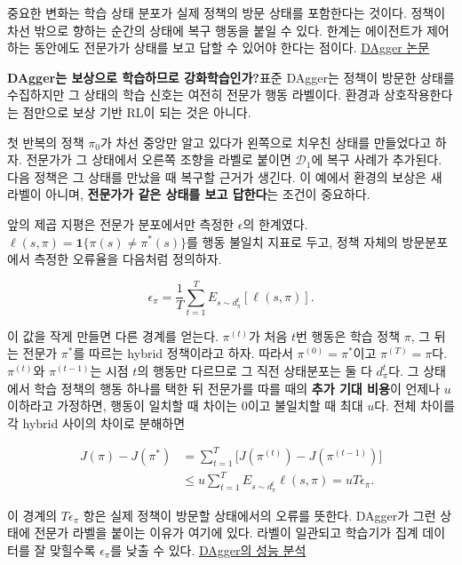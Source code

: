\documentclass[11pt,a4paper]{article}
\begin{document}
중요한 변화는 학습 상태 분포가 실제 정책의 방문 상태를 포함한다는 것이다. 정책이 차선 밖으로 향하는 순간의 상태에 복구 행동을 붙일 수 있다. 한계는 에이전트가 제어하는 동안에도 전문가가 상태를 보고 답할 수 있어야 한다는 점이다. \href{https://arxiv.org/abs/1011.0686}{DAgger 논문}\par

\par\medskip\noindent\textbf{DAgger는 보상으로 학습하므로 강화학습인가?}\quad 표준 DAgger는 정책이 방문한 상태를 수집하지만 그 상태의 학습 신호는 여전히 전문가 행동 라벨이다. 환경과 상호작용한다는 점만으로 보상 기반 RL이 되는 것은 아니다.\par

첫 반복의 정책 $\pi_0$가 차선 중앙만 알고 있다가 왼쪽으로 치우친 상태를 만들었다고 하자. 전문가가 그 상태에서 오른쪽 조향을 라벨로 붙이면 $\mathcal D_1$에 복구 사례가 추가된다. 다음 정책은 그 상태를 만났을 때 복구할 근거가 생긴다. 이 예에서 환경의 보상은 새 라벨이 아니며, \textbf{전문가가 같은 상태를 보고 답한다}는 조건이 중요하다.\par

앞의 제곱 지평은 전문가 분포에서만 측정한 $\epsilon$의 한계였다. $\ell(s,\pi)=\mathbf 1\{\pi(s)\ne\pi^*(s)\}$를 행동 불일치 지표로 두고, 정책 자체의 방문분포에서 측정한 오류율을 다음처럼 정의하자.\par

\[
\epsilon_\pi=\frac{1}{T}\sum_{t=1}^T
E_{s\sim d_\pi^t}[\ell(s,\pi)].
\]

이 값을 작게 만들면 다른 경계를 얻는다. $\pi^{(t)}$가 처음 $t$번 행동은 학습 정책 $\pi$, 그 뒤는 전문가 $\pi^*$를 따르는 hybrid 정책이라고 하자. 따라서 $\pi^{(0)}=\pi^*$이고 $\pi^{(T)}=\pi$다. $\pi^{(t)}$와 $\pi^{(t-1)}$는 시점 $t$의 행동만 다르므로 그 직전 상태분포는 둘 다 $d_\pi^t$다. 그 상태에서 학습 정책의 행동 하나를 택한 뒤 전문가를 따를 때의 \textbf{추가 기대 비용}이 언제나 $u$ 이하라고 가정하면, 행동이 일치할 때 차이는 0이고 불일치할 때 최대 $u$다. 전체 차이를 각 hybrid 사이의 차이로 분해하면\par

\[
\begin{aligned}
J(\pi)-J(\pi^*)
&=\sum_{t=1}^T\bigl[J(\pi^{(t)})-J(\pi^{(t-1)})\bigr]\\
&\le u\sum_{t=1}^T E_{s\sim d_\pi^t}\ell(s,\pi)
=uT\epsilon_\pi.
\end{aligned}
\]

이 경계의 $T\epsilon_\pi$ 항은 실제 정책이 방문할 상태에서의 오류를 뜻한다. DAgger가 그런 상태에 전문가 라벨을 붙이는 이유가 여기에 있다. 라벨이 일관되고 학습기가 집계 데이터를 잘 맞힐수록 $\epsilon_\pi$를 낮출 수 있다. \href{https://proceedings.mlr.press/v15/ross11a/ross11a.pdf}{DAgger의 성능 분석}\par
\end{document}
